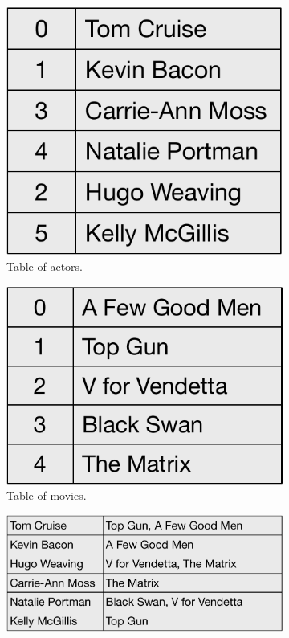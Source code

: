\begin{figure}[ht]
 \begin{subfigure}[t]{0.15\textwidth}
    \small
    \centering
    \includegraphics[width=0.825\linewidth]{figs/actor-table.pdf}
    \caption{\label{fig:actor-table}
    Table of actors.}
  \end{subfigure}
\hspace{1em}
   \begin{subfigure}[t]{0.167\textwidth}
    \small
    \centering
    \includegraphics[width=0.825\linewidth]{figs/movie-table.pdf}
    \caption{\label{fig:movie-table}
    Table of movies.}
  \end{subfigure}
\hspace{1em}
     \begin{subfigure}[t]{0.3\textwidth}
    \small
    \centering
    \includegraphics[width=0.825\linewidth]{figs/actor-movie-table.pdf}

\end{subfigure}
\end{figure}

